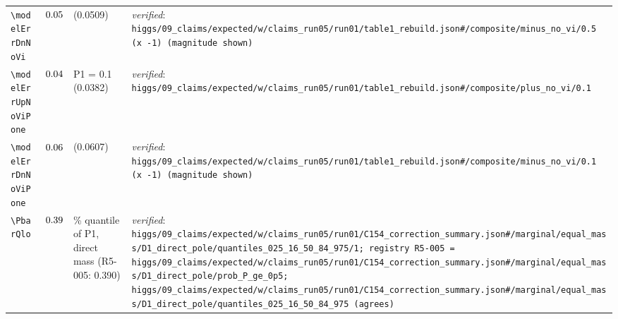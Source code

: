 {\begin{longtable}{@{}>{\raggedright\arraybackslash}p{}>{\raggedright\arraybackslash}p{}>{\raggedright\arraybackslash}p{}>{\raggedright\arraybackslash}p{}@{}}
\texttt{\textbackslash modelErrDnNoVi} & $0.05$ & (0.0509) & \emph{verified}: \texttt{higgs/\allowbreak{}09\_\allowbreak{}claims/\allowbreak{}expected/\allowbreak{}w/\allowbreak{}claims\_\allowbreak{}run05/\allowbreak{}run01/\allowbreak{}table1\_\allowbreak{}rebuild.json\#/\allowbreak{}composite/\allowbreak{}minus\_\allowbreak{}no\_\allowbreak{}vi/\allowbreak{}0.5 (x -1) (magnitude shown)} \\
\texttt{\textbackslash modelErrUpNoViPone} & $0.04$ & P1 = 0.1 (0.0382) & \emph{verified}: \texttt{higgs/\allowbreak{}09\_\allowbreak{}claims/\allowbreak{}expected/\allowbreak{}w/\allowbreak{}claims\_\allowbreak{}run05/\allowbreak{}run01/\allowbreak{}table1\_\allowbreak{}rebuild.json\#/\allowbreak{}composite/\allowbreak{}plus\_\allowbreak{}no\_\allowbreak{}vi/\allowbreak{}0.1} \\
\texttt{\textbackslash modelErrDnNoViPone} & $0.06$ & (0.0607) & \emph{verified}: \texttt{higgs/\allowbreak{}09\_\allowbreak{}claims/\allowbreak{}expected/\allowbreak{}w/\allowbreak{}claims\_\allowbreak{}run05/\allowbreak{}run01/\allowbreak{}table1\_\allowbreak{}rebuild.json\#/\allowbreak{}composite/\allowbreak{}minus\_\allowbreak{}no\_\allowbreak{}vi/\allowbreak{}0.1 (x -1) (magnitude shown)} \\
\texttt{\textbackslash PbarQlo} & $0.39$ & 16\% quantile of P1, direct mass (R5-005: 0.390) & \emph{verified}: \texttt{higgs/\allowbreak{}09\_\allowbreak{}claims/\allowbreak{}expected/\allowbreak{}w/\allowbreak{}claims\_\allowbreak{}run05/\allowbreak{}run01/\allowbreak{}C154\_\allowbreak{}correction\_\allowbreak{}summary.json\#/\allowbreak{}marginal/\allowbreak{}equal\_\allowbreak{}mass/\allowbreak{}D1\_\allowbreak{}direct\_\allowbreak{}pole/\allowbreak{}quantiles\_\allowbreak{}025\_\allowbreak{}16\_\allowbreak{}50\_\allowbreak{}84\_\allowbreak{}975/\allowbreak{}1; registry R5-005 = higgs/\allowbreak{}09\_\allowbreak{}claims/\allowbreak{}expected/\allowbreak{}w/\allowbreak{}claims\_\allowbreak{}run05/\allowbreak{}run01/\allowbreak{}C154\_\allowbreak{}correction\_\allowbreak{}summary.json\#/\allowbreak{}marginal/\allowbreak{}equal\_\allowbreak{}mass/\allowbreak{}D1\_\allowbreak{}direct\_\allowbreak{}pole/\allowbreak{}prob\_\allowbreak{}P\_\allowbreak{}ge\_\allowbreak{}0p5; higgs/\allowbreak{}09\_\allowbreak{}claims/\allowbreak{}expected/\allowbreak{}w/\allowbreak{}claims\_\allowbreak{}run05/\allowbreak{}run01/\allowbreak{}C154\_\allowbreak{}correction\_\allowbreak{}summary.json\#/\allowbreak{}marginal/\allowbreak{}equal\_\allowbreak{}mass/\allowbreak{}D1\_\allowbreak{}direct\_\allowbreak{}pole/\allowbreak{}quantiles\_\allowbreak{}025\_\allowbreak{}16\_\allowbreak{}50\_\allowbreak{}84\_\allowbreak{}975 (agrees)} \\

\end{longtable}}

